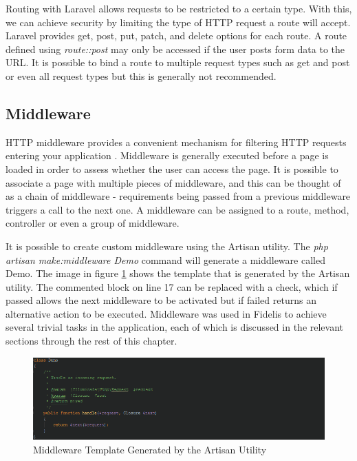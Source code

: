 Routing with Laravel allows requests to be restricted to a certain type. With this, we can achieve security by limiting the type of HTTP request a route will accept. Laravel provides get, post, put, patch, and delete options for each route. A route defined using \emph{route::post} may only be accessed if the user posts form data to the URL. It is possible to bind a route to multiple request types such as get and post or even all request types but this is generally not recommended.

\subsection{Middleware}
HTTP middleware provides a convenient mechanism for filtering HTTP requests entering your application \cite{Laravel:Middleware}. Middleware is generally executed before a page is loaded in order to assess whether the user can access the page. It is possible to associate a page with multiple pieces of middleware, and this can be thought of as a chain of middleware - requirements being passed from a previous middleware triggers a call to the next one. A middleware can be assigned to a route, method, controller or even a group of middleware.

It is possible to create custom middleware using the Artisan utility. The \textit{php artisan make:middleware Demo} command will generate a middleware called Demo. The image in figure \ref{fig:MiddlewareTemplate} shows the template that is generated by the Artisan utility. The commented block on line 17 can be replaced with a check, which if passed allows the next middleware to be activated but if failed returns an alternative action to be executed. Middleware was used in Fidelis to achieve several trivial tasks in the application, each of which is discussed in the relevant sections through the rest of this chapter.

\begin{figure}[H]
    \centering
    \includegraphics[width=\textwidth]{Images/Implementation/MiddlewareTemplate}
    \caption{Middleware Template Generated by the Artisan Utility} \label{fig:MiddlewareTemplate}
\end{figure}